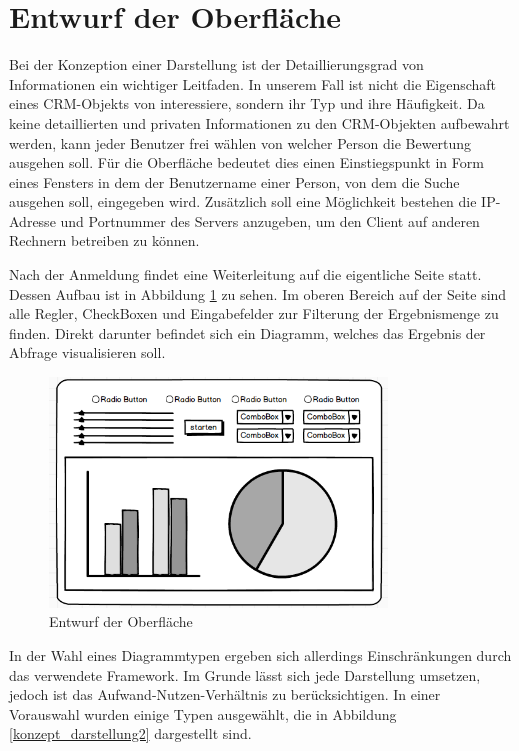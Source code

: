 \section{Entwurf der Oberfläche}
\label{ch:Konzeption:sec:Darstellungskonzepte}

Bei der Konzeption einer Darstellung ist der Detaillierungsgrad von Informationen ein wichtiger Leitfaden. In unserem Fall ist nicht die Eigenschaft eines CRM-Objekts von interessiere, sondern ihr Typ und ihre Häufigkeit. Da keine detaillierten und privaten Informationen zu den CRM-Objekten aufbewahrt werden, kann jeder Benutzer frei wählen von welcher Person die Bewertung ausgehen  soll. Für die Oberfläche bedeutet dies einen Einstiegspunkt in Form eines Fensters in dem der Benutzername einer Person, von dem die Suche ausgehen soll, eingegeben wird. Zusätzlich soll eine Möglichkeit bestehen die IP-Adresse und Portnummer des Servers anzugeben, um den Client auf anderen Rechnern betreiben zu können.

Nach der Anmeldung findet eine Weiterleitung auf die eigentliche Seite statt. Dessen Aufbau ist in Abbildung \ref{konzept_darstellung} zu sehen. Im oberen Bereich auf der Seite sind alle Regler, CheckBoxen und Eingabefelder zur Filterung der Ergebnismenge zu finden. Direkt darunter befindet sich ein Diagramm, welches das Ergebnis der Abfrage visualisieren soll.

\begin{figure}[htbp]
\centering
  \includegraphics[width=0.8\textwidth, width=0.8\textwidth]{pics/mockup.png}
\caption{Entwurf der Oberfläche}
\label{konzept_darstellung}
\end{figure} 

In der Wahl eines Diagrammtypen ergeben sich allerdings Einschränkungen durch das verwendete Framework. Im Grunde lässt sich jede Darstellung umsetzen, jedoch ist das Aufwand-Nutzen-Verhältnis zu berücksichtigen. In einer Vorauswahl wurden einige  Typen ausgewählt, die in Abbildung \ref{konzept_darstellung2} dargestellt sind. 

